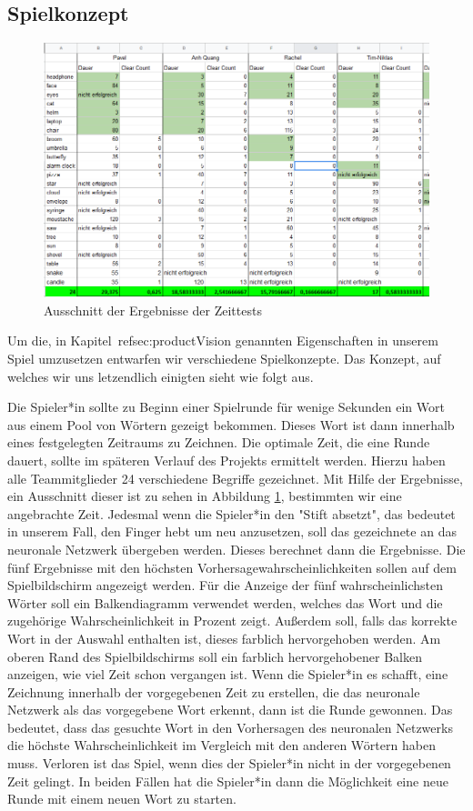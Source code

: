 \documentclass[11pt]{article}
\begin{document}
\subsection{Spielkonzept}
\label{sec:spielkonzept}
\begin{figure}[ht]
	\centering
	\includegraphics[width=1\textwidth]{images/blindtesting.png}
	\caption{\label{fig:blindtestingtable}Ausschnitt der Ergebnisse der Zeittests}
\end{figure}
Um die, in Kapitel~ref{sec:productVision} genannten Eigenschaften in unserem Spiel umzusetzen entwarfen wir verschiedene Spielkonzepte. Das Konzept, auf welches wir uns letzendlich einigten sieht wie folgt aus.

Die Spieler*in sollte zu Beginn einer Spielrunde für wenige Sekunden ein Wort aus einem Pool von Wörtern gezeigt bekommen. Dieses Wort ist dann innerhalb eines festgelegten Zeitraums zu Zeichnen. Die optimale Zeit, die eine Runde dauert, sollte im späteren Verlauf des Projekts ermittelt werden. Hierzu haben alle Teammitglieder 24 verschiedene Begriffe gezeichnet. Mit Hilfe der Ergebnisse, ein Ausschnitt dieser ist zu sehen in Abbildung \ref{fig:blindtestingtable}, bestimmten wir eine angebrachte Zeit.
Jedesmal wenn die Spieler*in den "Stift absetzt", das bedeutet in unserem Fall, den Finger hebt um neu anzusetzen, soll das gezeichnete an das neuronale Netzwerk übergeben werden. Dieses berechnet dann die Ergebnisse. Die fünf Ergebnisse mit den höchsten Vorhersagewahrscheinlichkeiten sollen auf dem Spielbildschirm angezeigt werden. Für die Anzeige der fünf wahrscheinlichsten Wörter soll ein Balkendiagramm verwendet werden, welches das Wort und die zugehörige Wahrscheinlichkeit in Prozent zeigt. Außerdem soll, falls das korrekte Wort in der Auswahl enthalten ist, dieses farblich hervorgehoben werden. Am oberen Rand des Spielbildschirms soll ein farblich hervorgehobener Balken anzeigen, wie viel Zeit schon vergangen ist.
Wenn die Spieler*in es schafft, eine Zeichnung innerhalb der vorgegebenen Zeit zu erstellen, die das neuronale Netzwerk als das vorgegebene Wort erkennt, dann ist die Runde gewonnen. Das bedeutet, dass das gesuchte Wort in den Vorhersagen des neuronalen Netzwerks die höchste Wahrscheinlichkeit im Vergleich mit den anderen Wörtern haben muss.
Verloren ist das Spiel, wenn dies der Spieler*in nicht in der vorgegebenen Zeit gelingt.
In beiden Fällen hat die Spieler*in dann die Möglichkeit eine neue Runde mit einem neuen Wort zu starten.
\end{document}
